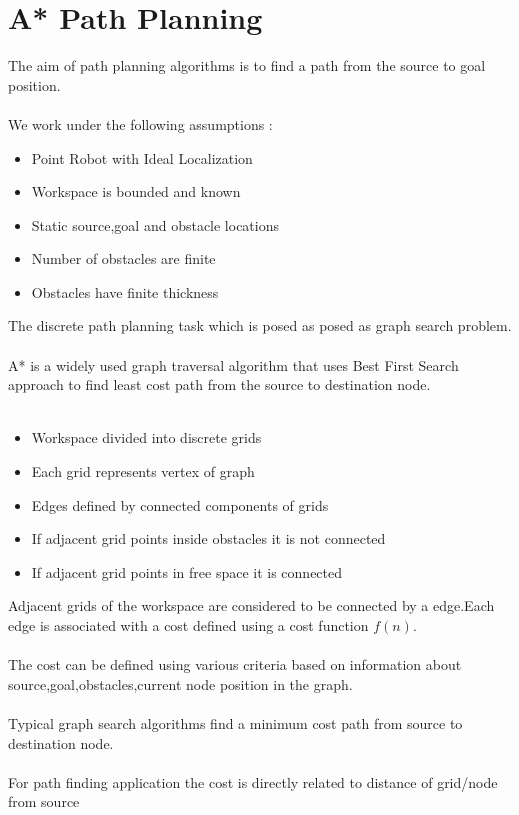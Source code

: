 \documentclass[fontsize=12pt, %
                             paper=a4, %
                             oneside, %
                             captions=tableheading,
                             index=totoc,
                             hyperref]{labbook}
\begin{document}
\section{A* Path Planning}
The aim of path planning algorithms is to find a path from the source to goal position.
\\\\
We work under the following assumptions :
\begin{itemize}
 \item Point Robot with Ideal Localization
 \item Workspace is bounded and known
 \item Static source,goal and obstacle locations
 \item Number of obstacles are finite 
 \item Obstacles have finite thickness
\end{itemize}
The discrete path planning task which is posed as posed as graph search problem.
\\\\
A* is a widely used graph traversal algorithm that uses Best First Search approach to 
find least cost path from the source to destination node.
\\\\
\begin{itemize}
 \item Workspace divided into discrete grids
 \item Each grid represents vertex of graph
 \item Edges defined by connected components of grids
 \item If adjacent grid points inside obstacles it is not connected
 \item If adjacent grid points in free space it is connected
\end{itemize}
Adjacent grids of the workspace are considered
to be connected by a edge.Each edge is associated with a cost defined using a cost function $f(n)$.
\\\\
The cost can be defined using various criteria based on information about source,goal,obstacles,current
node position in the graph.
\\\\
Typical graph search algorithms find a minimum cost path from source to destination node.
\\\\
For path finding application the cost is directly related to distance of grid/node from source
\end{document}
